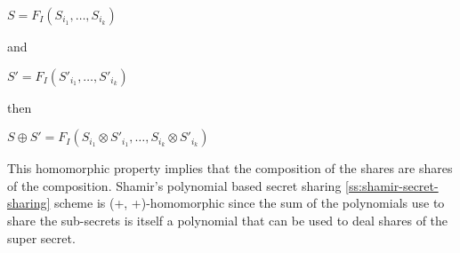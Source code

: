 \hfil $S = F_I(S_{i_1}, \dots, S_{i_k})$

and

\hfil $S' = F_I(S'_{i_1}, \dots, S'_{i_k})$

then

\hfil $S \oplus S' = F_I(S_{i_1} \otimes S'_{i_1}, \dots, S_{i_k} \otimes S'_{i_k})$


This homomorphic property implies that the composition of the shares are shares of the
composition.
Shamir’s polynomial based secret sharing \ref{ss:shamir-secret-sharing} scheme is (+, +)-homomorphic since the sum of the polynomials use to share the sub-secrets is itself a polynomial that can be used to deal shares of the super secret.


